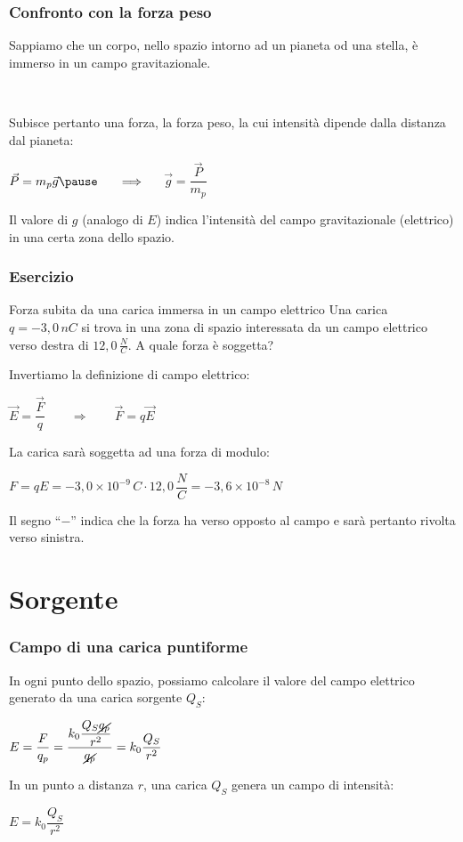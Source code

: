 \documentclass[]{beamer}
\theoremstyle{plain}
\begin{document}
\begin{frame}
\frametitle{Confronto con la forza peso}
Sappiamo che un corpo, nello spazio intorno ad un pianeta od una stella, è immerso in un \alert<1>{campo gravitazionale}.\pause

~

Subisce pertanto una forza, la \alert<2-3>{forza peso}, la cui intensità dipende dalla distanza dal pianeta:
\begin{center}
$ \vec{P} = m_p\vec{g} \pause ~~~~~\Longrightarrow~~~~~ $\colorbox{blue!30}{$ \vec{g} = \dfrac{\vec{P}}{m_p} $}\pause
\end{center}
Il valore di $ g $ (analogo di $ E $) indica \alert{l'intensità del campo gravitazionale} (elettrico) in una certa zona dello spazio.
\end{frame}







\begin{frame}
\frametitle{Esercizio}

  \begin{exampleblock}{Forza subita da una carica immersa in un campo elettrico}
{\small Una carica $ q = - 3,0 \, nC $ si trova in una zona di spazio interessata da un campo elettrico verso destra di $ 12,0 \, \frac{N}{C} $. A quale forza è soggetta?}
\end{exampleblock}
  \pause
  Invertiamo la definizione di campo elettrico:
  \begin{center}
  $ \vec{E} = \dfrac{\vec{F}}{q} \quad\quad \Longrightarrow \quad\quad \vec{F}=q\vec{E} $
  \end{center}\pause
  La carica sarà soggetta ad una forza di modulo:
  \begin{center}
  $ F = qE = - 3,0 \times 10^{-9} \, C \cdot 12,0 \, \dfrac{N}{C} = - 3,6 \times 10^{-8} \, N $
  \end{center}\pause
Il segno ``$ - $'' indica che la forza ha verso opposto al campo e sarà pertanto rivolta verso sinistra.

\end{frame}

\section{Sorgente}

\begin{frame}
\frametitle{Campo di una carica puntiforme}
In ogni punto dello spazio, possiamo calcolare il valore del campo elettrico generato da una carica sorgente $ Q_S $:
\begin{center}
$ E = \dfrac{F}{q_p} = \dfrac{k_0 \dfrac{Q_S \cancel{q_p}}{r^2}}{\cancel{q_p}} = k_0 \dfrac{Q_S }{r^2} $
\end{center}\pause
In un punto a distanza $ r $, una carica $ Q_S $ genera un campo di intensità:
\begin{center}
\colorbox{blue!30}{$ E = k_0 \dfrac{Q_S}{r^2} $}
\end{center}
\end{frame}
\end{document}

